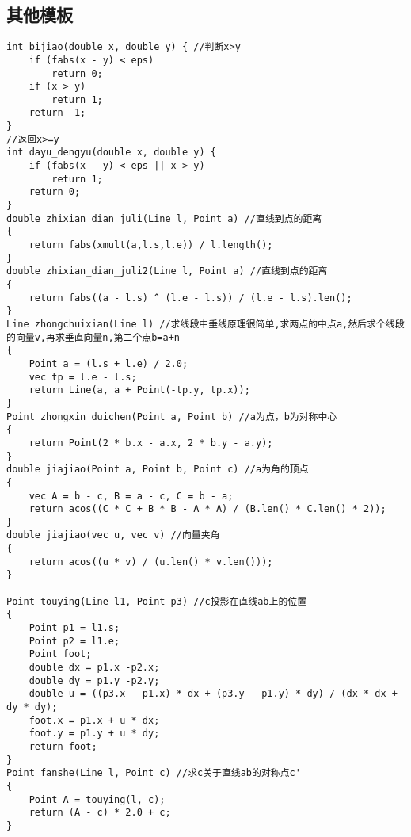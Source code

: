 \subsection{其他模板}
\begin{lstlisting}
int bijiao(double x, double y) { //判断x>y
	if (fabs(x - y) < eps)
		return 0;
	if (x > y)
		return 1;
	return -1;
}
//返回x>=y
int dayu_dengyu(double x, double y) {
	if (fabs(x - y) < eps || x > y)
		return 1;
	return 0;
}
double zhixian_dian_juli(Line l, Point a) //直线到点的距离
{
	return fabs(xmult(a,l.s,l.e)) / l.length();
}
double zhixian_dian_juli2(Line l, Point a) //直线到点的距离
{
	return fabs((a - l.s) ^ (l.e - l.s)) / (l.e - l.s).len();
}
Line zhongchuixian(Line l) //求线段中垂线原理很简单,求两点的中点a,然后求个线段的向量v,再求垂直向量n,第二个点b=a+n
{
	Point a = (l.s + l.e) / 2.0;
	vec tp = l.e - l.s;
	return Line(a, a + Point(-tp.y, tp.x));
}
Point zhongxin_duichen(Point a, Point b) //a为点，b为对称中心
{
	return Point(2 * b.x - a.x, 2 * b.y - a.y);
}
double jiajiao(Point a, Point b, Point c) //a为角的顶点
{
	vec A = b - c, B = a - c, C = b - a;
	return acos((C * C + B * B - A * A) / (B.len() * C.len() * 2));
}
double jiajiao(vec u, vec v) //向量夹角
{
	return acos((u * v) / (u.len() * v.len()));
}

Point touying(Line l1, Point p3) //c投影在直线ab上的位置
{
	Point p1 = l1.s;
	Point p2 = l1.e;
	Point foot;
	double dx = p1.x -p2.x;
	double dy = p1.y -p2.y;
	double u = ((p3.x - p1.x) * dx + (p3.y - p1.y) * dy) / (dx * dx + dy * dy);
	foot.x = p1.x + u * dx;
	foot.y = p1.y + u * dy;
	return foot;
}
Point fanshe(Line l, Point c) //求c关于直线ab的对称点c'
{
	Point A = touying(l, c);
	return (A - c) * 2.0 + c;
}


\end{lstlisting}
